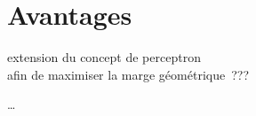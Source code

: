 \section{Avantages}

\begin{itmz}
\item{extension du concept de perceptron\\
afin de maximiser la marge géométrique ???}
\end{itmz}

…

\pagebreak
